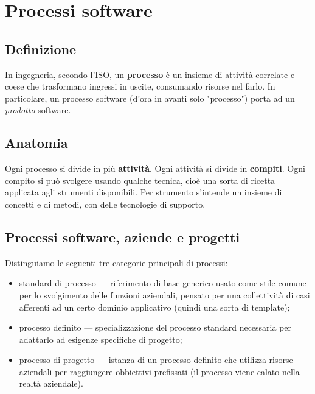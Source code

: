 \documentclass[a4paper]{article}
\begin{document}
		
	\section{Processi software}


		
	\subsection{Definizione}

		
In ingegneria, secondo l'ISO, un \textbf{processo} è un insieme di attività correlate e coese che trasformano ingressi in uscite, consumando risorse nel farlo. In particolare, un processo software (d'ora in avanti solo "processo") porta ad un \emph{prodotto} software.

		
	\subsection{Anatomia}

		
Ogni processo si divide in più \textbf{attività}. Ogni attività si divide in \textbf{compiti}. Ogni compito si può svolgere usando qualche tecnica, cioè una sorta di ricetta applicata agli strumenti disponibili. Per strumento s'intende un insieme di concetti e di metodi, con delle tecnologie di supporto.

		
	\subsection{Processi software, aziende e progetti}

		
Distinguiamo le seguenti tre categorie principali di processi:
		
	\begin{itemize}
		
			
	\item standard di processo --- riferimento di base generico usato come stile comune per lo svolgimento delle funzioni aziendali, pensato per una collettività di casi afferenti ad un certo dominio applicativo (quindi una sorta di template); %

			
	\item processo definito --- specializzazione del processo standard necessaria per adattarlo ad esigenze specifiche di progetto;
			
	\item processo di progetto --- istanza di un processo definito che utilizza risorse aziendali per raggiungere obbiettivi prefissati (il processo viene calato nella realtà aziendale).
		
	\end{itemize}
\end{document}
